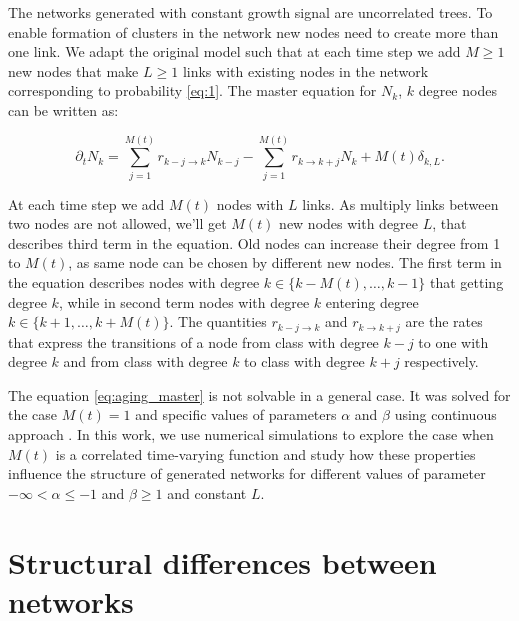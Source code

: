 The networks generated with constant growth signal are uncorrelated trees. To enable formation of clusters in the network new nodes need to create more than one link. We adapt the original model such that at each time step we add $M\geq1$ new nodes that make $L\geq1$ links with existing nodes in the network corresponding to probability \ref{eq:1}. 
The master equation for $N_k$, $k$ degree nodes can be written as:

\begin{equation}
\partial_{t}N_{k}=\sum^{M(t)}_{j=1}r_{k-j\longrightarrow k}N_{k-j}-\sum^{M(t)}_{j=1}r_{k\longrightarrow k+j}N_{k}+M(t)\delta_{k,L} . \label{eq:aging_master}  
\end{equation}

At each time step we add $M(t)$ nodes with $L$ links. As multiply links between two nodes are not allowed, we'll get $M(t)$ new nodes with degree $L$, that describes third term in the equation. Old nodes can increase their degree from 1 to $M(t)$, as same node can be chosen by different new nodes. The first term in the equation describes nodes with degree $k\in\{k-M(t),\ldots, k-1\}$ that getting degree $k$, while in second term nodes with degree $k$ entering degree  $k\in\{k+1,\ldots, k+M(t)\}$. The quantities $r_{k-j\longrightarrow k}$ and $r_{k\longrightarrow k+j}$ are the rates that express the transitions of a node from class with degree $k-j$ to one with degree $k$ and from class with degree $k$ to class with degree $k+j$ respectively. 

The equation \ref{eq:aging_master} is not solvable in a general case. It was solved for the case $M(t)=1$ and specific values of parameters $\alpha$ and $\beta$ using continuous approach \cite{dorogovtsev2001b}. In this work, we use numerical simulations to explore the case when $M(t)$ is a correlated time-varying function and study how these properties influence the structure of generated networks for different values of parameter $-\infty<\alpha\leq-1$ and $\beta\geq1$ and constant $L$.


\section{Structural differences between networks }



